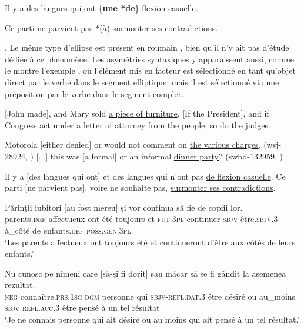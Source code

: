 {\ea 
Il y a des langues qui ont \{\textbf{une {\textbar} *de}\} flexion casuelle. \label{ch1:foot30:exi} 
\z

\ea 
Ce parti ne parvient pas *(à) surmonter ses contradictions. \label{ch1:foot30:exii}
\z

}. Le même type d’ellipse est présent en roumain , bien qu’il n’y ait pas d’étude dédiée à ce phénomène. Les asymétries syntaxiques y apparaissent aussi, comme le montre l’exemple , où l’élément mis en facteur est sélectionné en tant qu’objet direct par le verbe dans le segment elliptique, mais il est sélectionné via une préposition par le verbe dans le segment complet. 

\ea \label{ch1:ex78}
\ea{} [John made], and Mary sold \uline{a piece of furniture}. \label{ch1:ex78a}
\ex{} [If the President], and if Congress \uline{act under a letter of attorney from the people}, so do the judges. \label{ch1:ex78b}   
\z
\z

\ea
\ea  Motorola [either denied] or would not comment on \uline{the various charges}. (wsj-28924, \citealt{Bilbiie2013b}) \label{ch1:ex79a} 
\ex{} [...] this was [a formal] or an informal \uline{dinner party}? (swbd-132959, \citealt{Bilbiie2013b}) \label{ch1:ex79b} 
\z
\z

\ea \label{ch1:ex80}
\ea  Il y a [des langues qui ont] et des langues qui n’ont pas \uline{de flexion casuelle}. 
\ex  Ce parti [ne parvient pas], voire ne souhaite pas, \uline{surmonter ses contradictions}.
\z
\z

\ea \label{ch1:ex81}
\ea
\gll  Părinţii  iubitori  [au  fost  mereu]  și  vor  continua  să  fie  de copiii lor. \\
parents.\textsc{def}  affectueux  ont  été  toujours  et  \textsc{fut.3pl}  continuer  \textsc{sbjv}  être.\textsc{sbjv.3} à\_côté  de  enfants\textsc{.def}  \textsc{poss.gen.3pl} \\
\glt ‘Les parents affectueux ont toujours été et continueront d’être aux côtés de leurs enfants.’ 

\ex
\gll   Nu  cunosc  pe  nimeni  care  [să-şi  fi  dorit]  sau măcar  să  se  fi  gândit  la  asemenea rezultat. \label{ch1:ex81b}\\
    \textsc{neg}  connaître.\textsc{prs.1sg} \textsc{dom}  personne  qui  \textsc{sbjv-refl.dat.3}  être  désiré  ou     au\_moins   \textsc{sbjv} \textsc{refl.acc.3}  être  pensé  à  un  tel  résultat\\
\glt ‘Je ne connais personne qui ait désiré ou au moins qui ait pensé à un tel résultat.’ 
\z
\z


